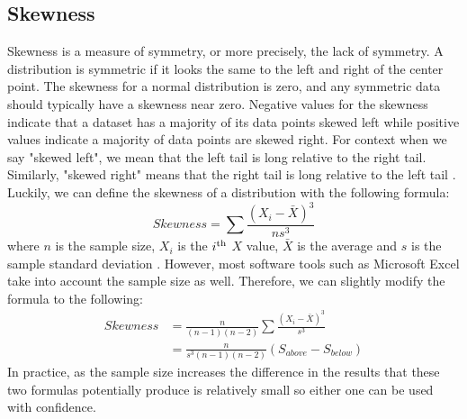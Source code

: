 \subsection{Skewness}

Skewness is a measure of symmetry, or more precisely, the lack of symmetry. A 
distribution is symmetric if it looks the same to the left and right of the center 
point. The skewness for a normal distribution is zero, and any symmetric data 
should typically have a skewness near zero. Negative values for the skewness 
indicate that a dataset has a majority of its data points skewed left while positive 
values indicate a majority of data points are skewed right. For context when we
say "skewed left", we mean that the left tail is long relative to the right tail. 
Similarly, "skewed right" means that the right tail is long relative to the 
left tail \cite{c13}. Luckily, we can define the skewness of a distribution with the 
following formula:
\begin{equation}
    Skewness = \sum{}{} \frac{(X_i-\bar{X})^3}{ns^3}
\end{equation}
where $n$ is the sample size, $X_i$ is the $i\textsuperscript{th}$ $X$ value, $\bar{X}$ 
is the average and $s$ is the sample standard deviation \cite{c14}. However, most software 
tools such as Microsoft Excel take into account the sample size as well. Therefore,
we can slightly modify the formula to the following:
\begin{equation}
    \begin{split}
        Skewness & = \frac{n}{(n-1)(n-2)}\sum{}{} \frac{(X_i-\bar{X})^3}{s^3} \\
        & = \frac{n}{s^3(n-1)(n-2)}(S_{above} - S_{below})
    \end{split}
\end{equation}
In practice, as the sample size increases the difference in the results that these 
two formulas potentially produce is relatively small so either one can be used with 
confidence. 
